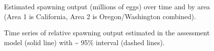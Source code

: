 \documentclass[
]{scrartcl}
\begin{document}
\begin{figure}


\caption{\label{fig-spout_area}Estimated spawning output (millions of
eggs) over time and by area (Area 1 is California, Area 2 is
Oregon/Washington combined).}

\end{figure}%

\begin{figure}


\caption{\label{fig-status_combined}Time series of relative spawning
output estimated in the assessment model (solid line) with
\textasciitilde{} 95\% interval (dashed lines).}

\end{figure}%
\end{document}
